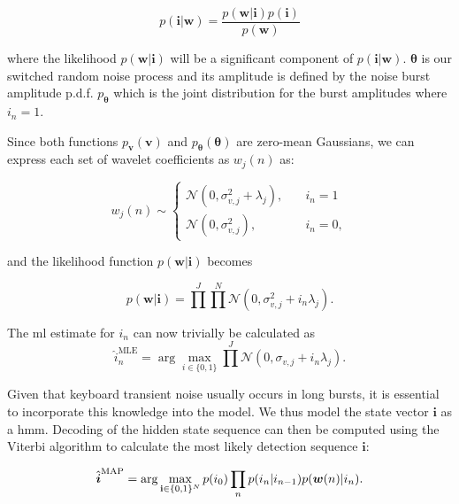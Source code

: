 \begin{equation}\label{eq:Bayes}
p(\boldsymbol{i}|\boldsymbol{w}) = \frac{p(\boldsymbol{w}|\boldsymbol{i})p(\boldsymbol{i})}{p(\boldsymbol{w})}
\end{equation}

where the likelihood $p(\boldsymbol{w}|\boldsymbol{i})$ will be a significant component of $p(\boldsymbol{i}|\boldsymbol{w})$.
$\boldsymbol{\theta}$ is our switched random noise process and its amplitude is defined by the noise burst amplitude p.d.f. $p_{\boldsymbol{\theta}}$ which is the joint distribution for the burst amplitudes where $i_{n} = 1$.

Since both functions $p_{\boldsymbol{v}}(\boldsymbol{v})$ and $p_{\boldsymbol{\theta}}(\boldsymbol{\theta})$ are zero-mean Gaussians, we can express each set of wavelet coefficients as $w_j(n)$ as:

\begin{equation}\label{eq:cases}
  w_j(n) \sim
  \begin{cases}
    \mathcal{N}(0,\sigma_{v,j}^2 + \lambda_j), & \quad i_n = 1\\
   \mathcal{N}(0,\sigma_{v,j}^2), & \quad i_n = 0,
  \end{cases}
\end{equation}

and the likelihood function $p(\boldsymbol{w}|\boldsymbol{i})$ becomes

\begin{equation}\label{eq:likelihood1}
p(\boldsymbol{w}|\boldsymbol{i}) = \prod^J \prod^N \mathcal{N}(0,\sigma_{v,j}^2 + i_n\lambda_j).
\end{equation}

The \gls{ml} estimate for $i_n$ can now trivially be calculated as
\begin{equation}\label{eq:ml1}
\hat{i}_n^{\textrm{MLE}} = \arg\max_{i\in\{0,1\}} \prod^J \mathcal{N}(0,\sigma_{v,j} + i_n\lambda_j).
\end{equation}

Given that keyboard transient noise usually occurs in long bursts, it is essential to incorporate this knowledge into the model. We thus model the state vector $\boldsymbol{i}$ as a \gls{hmm}. Decoding of the hidden state sequence can then be computed using the Viterbi algorithm \cite{Viterbi1967}\cite{Forney1973} to calculate the most likely detection sequence $\boldsymbol{i}$:

\begin{equation}\label{eq:viterbi}
\hat{\boldsymbol{i}}^{\textrm{MAP}} = \arg\max_{{\bf i}\in\{0,1\}^N} p(i_{0})\prod_n p(i_n | i_{n-1})p(\boldsymbol{w}(n) | i_n).
\end{equation}


